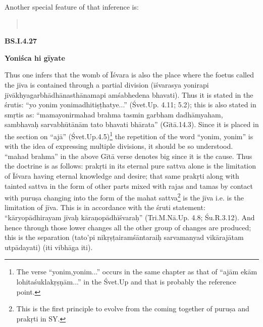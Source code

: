 Another special feature of that inference is:

\textbf{}


\begin{verse}
\\
\end{verse}


\textbf{BS.I.4.27}

\textbf{Yoniśca hi gīyate}

Thus one infers that the womb of Īśvara is also the place where the foetus called the jīva is contained through a partial division (īśvarasya yonirapi jīvākhyagarbhādhānasthānamapi amśabhedena bhavati). Thus it is stated in the śrutis: “yo yonim yonimadhitiṣṭhatye...” (Śvet.Up. 4.11; 5.2); this is also stated in smṛtis as: “mamayonirmahad brahma tasmin garbham dadhāmyaham, sambhavaḥ sarvabhūtānām tato bhavati bhārata” (Gītā.14.3). Since it is placed in the section on “ajā” (Śvet.\-Up.4.5)\footnote{The verse “yonim,yonim...” occurs in the same chapter as that of “ajām ekām lohitaśuklakṛṣṇām...” in the Śvet.Up and that is probably the reference point.} the repetition of the word “yonim, yonim” is with the idea of expressing multiple divisions, it should be so understood. “mahad brahma” in the above Gītā verse denotes big since it is the cause. Thus the doctrine is as follows: prakṛti in its eternal pure sattva alone is the limitation of Īśvara having eternal knowledge and desire; that same prakṛti along with tainted sattva in the form of other parts mixed with rajas and tamas by contact with puruṣa changing into the form of the mahat sattva\footnote{This is the first principle to evolve from the coming together of puruṣa and prakṛti in SY.} is the jīva i.e. is the limitation of jīva. This is in accordance with the śruti statement: “kāryopādhirayam jīvaḥ kāraṇopādhīśvaraḥ” (Tri.M.Nā.Up. 4.8; Śu.R.3.12). And hence  through those lower changes all the other group of changes are produced; this is the separation (tato’pi nikṛṣṭairamśāntaraiḥ sarvamanyad vikārajātam utpādayati) (iti vibhāga iti).


